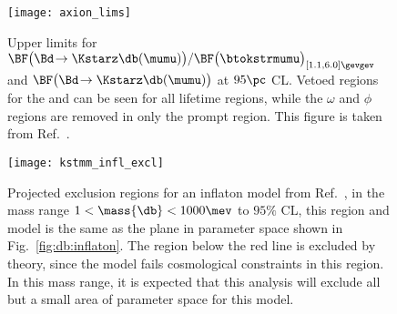 \begin{figure}
  \begin{center}
    \texttt{[image: axion\_lims]}
    \caption[Projected sensitivity in an inflaton search]
    {
      Upper limits for
      $\BF\big(\Bd\!\to\Kstarz\db(\mumu)\big) / \BF\big(\btokstrmumu\big)_{[1.1,6.0]\gevgev}$
      and $\BF\big(\Bd\!\to\Kstarz\db(\mumu)\big)$ at $95\pc$ CL.
      Vetoed regions for the \jpsi and \psitwos can be seen for all lifetime regions, while the
      $\omega$ and $\phi$ regions are removed in only the prompt region.
      This figure is taken from Ref.~\protect\cite{LHCb-PAPER-2015-036}.
    }
    \label{fig:db:excl:infl}
  \end{center}
\end{figure}


\begin{figure}
  \begin{center}
    \texttt{[image: kstmm\_infl\_excl]}
    \caption[Projected sensitivity in an inflaton search]
    {
      Projected exclusion regions for an inflaton model from Ref.~\protect\cite{Bezrukov:2014nza},
      in the mass range $1<\mass{\db}<1000\mev$ to $95\%$ CL, this region and model is the same as
      the plane in
      parameter space shown in Fig.~\protect\ref{fig:db:inflaton}.
      The region below the red line is excluded by theory, since the model fails cosmological
      constraints in this region.
      In this mass range, it is expected that this analysis will exclude all but a small area of
      parameter space for this model.
    }
    \label{fig:db:excl:infl:model}
  \end{center}
\end{figure}






